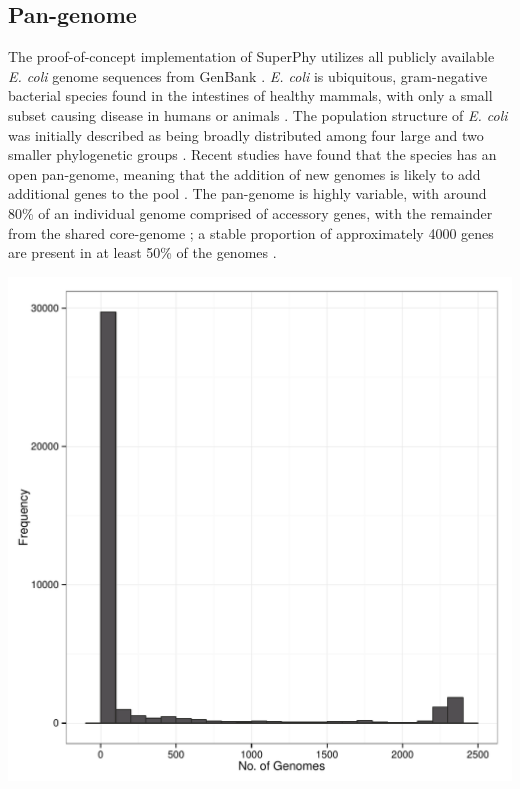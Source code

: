 \documentclass[doublespacing, linenumbers]{bmcart}
\begin{document}
\subsection{Pan-genome}
The proof-of-concept implementation of SuperPhy utilizes all publicly available \textit{E. coli} genome sequences from GenBank \cite{benson_genbank_2012}. \textit{E. coli} is ubiquitous, gram-negative bacterial species found in the intestines of healthy mammals, with only a small subset causing disease in humans or animals \cite{tenaillon_population_2010}. The population structure of \textit{E. coli} was initially described as being broadly distributed among four large and two smaller phylogenetic groups \cite{selander_methods_1986,goullet_comparative_1989}. Recent studies have found that the species has an open pan-genome, meaning that the addition of new genomes is likely to add additional genes to the pool \cite{medini_microbial_2005}. The pan-genome is highly variable, with around 80\% of an individual genome comprised of accessory genes, with the remainder from the shared core-genome \cite{lukjancenko_comparison_2010}; a stable proportion of approximately 4000 genes are present in at least 50\% of the genomes \cite{gordienko_evolution_2013}.

\includegraphics[width=\textwidth]{images/panGenomeSize.pdf}
\end{document}

